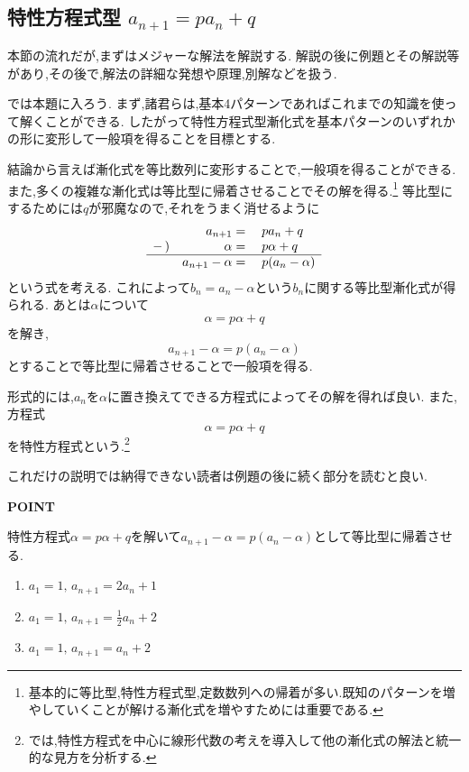 
\subsection{\texorpdfstring{特性方程式型  $a_{n+1}=pa_n+q$}{特性方程式型}}\label{節：特性方程式型}
  本節の流れだが,まずはメジャーな解法を解説する.
  解説の後に例題とその解説等があり,その後で,解法の詳細な発想や原理,別解などを扱う.
  
  では本題に入ろう.
  まず,諸君らは,基本4パターンであればこれまでの知識を使って解くことができる.
  したがって特性方程式型漸化式を基本パターンのいずれかの形に変形して一般項を得ることを目標とする.
  
  結論から言えば漸化式を等比数列に変形することで,一般項を得ることができる.
  また,多くの複雑な漸化式は等比型に帰着させることでその解を得る.\footnote{基本的に等比型,特性方程式型,定数数列への帰着が多い.既知のパターンを増やしていくことが解ける漸化式を増やすためには重要である.}
  等比型にするためには$q$が邪魔なので,それをうまく消せるように
  \[
    \begin{array}{rrl}
      &a_{n+1}={}&pa_n+q\\
      -\,)&\alpha={}&p\alpha+q\\ \hline
      &a_{n+1}-\alpha={}&p(a_n-\alpha)
    \end{array}
  \]
  という式を考える.
  これによって$b_n=a_n-\alpha$という$b_n$に関する等比型漸化式が得られる.
  あとは$\alpha$について
  \[
    \alpha=p\alpha+q
  \]
  を解き,
  \[
    a_{n+1}-\alpha=p(a_n-\alpha)
  \]
  とすることで等比型に帰着させることで一般項を得る.

  形式的には,$a_n$を$\alpha$に置き換えてできる方程式によってその解を得れば良い.
  また,方程式
  \[
    \alpha=p\alpha+q
  \]
  を特性方程式という.\footnote{では,特性方程式を中心に線形代数の考えを導入して他の漸化式の解法と統一的な見方を分析する.}

  これだけの説明では納得できない読者は例題の後に続く部分を読むと良い.

  \begin{bookpoint}
    \textbf{POINT}\par
    特性方程式$\alpha=p\alpha+q$を解いて$a_{n+1}-\alpha=p(a_n-\alpha)$として等比型に帰着させる.
  \end{bookpoint}
  \noindent {}\par\nobreak
  \begin{enumerate}[label=(\arabic*),parsep=3pt,format=\bookitemlink{example-characteristic-1}{problem}{answer}]
    \item $\displaystyle a_1=1,\, a_{n+1}=2a_n+1$
    \item $\displaystyle a_1=1,\, a_{n+1}=\frac{1}{2}a_n+2$
    \item $\displaystyle a_1=1,\, a_{n+1}=a_n+2$
  \end{enumerate}
  
